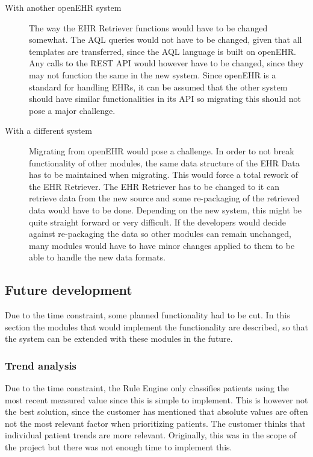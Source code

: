 \documentclass{article}
\begin{document}
\begin{description}
\item [With another openEHR system] The way the EHR Retriever functions would have to be changed somewhat. The AQL queries would not have to be changed, given that all templates are transferred, since the AQL language is built on openEHR. Any calls to the REST API would however have to be changed, since they may not function the same in the new system. Since openEHR is a standard for handling EHRs, it can be assumed that the other system should have similar functionalities in its API so migrating this should not pose a major challenge.

\item [With a different system] Migrating from openEHR would pose a challenge. In order to not break functionality of other modules, the same data structure of the EHR Data has to be maintained when migrating. This would force a total rework of the EHR Retriever. The EHR Retriever has to be changed to it can retrieve data from the new source and some re-packaging of the retrieved data would have to be done. Depending on the new system, this might be quite straight forward or very difficult. If the developers would decide against re-packaging the data so other modules can remain unchanged, many modules would have to have minor changes applied to them to be able to handle the new data formats.
\end{description}


\subsection{Future development}
Due to the time constraint, some planned functionality had to be cut. In this section the modules that would implement the functionality are described, so that the system can be extended with these modules in the future.


\subsubsection{Trend analysis}\label{trend-analysis}
Due to the time constraint, the Rule Engine only classifies patients using the most recent measured value since this is simple to implement. This is however not the best solution, since the customer has mentioned that absolute values are often not the most relevant factor when prioritizing patients. The customer thinks that individual patient trends are more relevant. Originally, this was in the scope of the project but there was not enough time to implement this. 
\end{document}
